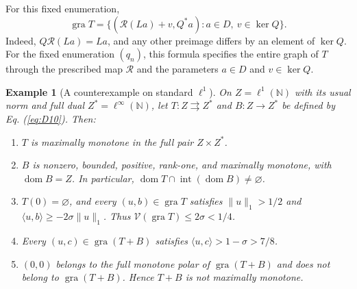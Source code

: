 \documentclass[11pt]{article}
\newcommand{\N}{\mathbb N}
\newcommand{\gra}{\operatorname{gra}}
\newcommand{\dom}{\operatorname{dom}}
\newcommand{\pair}[2]{\langle #1,#2\rangle}
\newtheorem{example}{Example}
\theoremstyle{definition}
\theoremstyle{remark}
\begin{document}
For this fixed enumeration,
\[
\gra T=\{(\mathcal R(La)+v,Q^*a):a\in D,\ v\in\ker Q\}.
\]
Indeed, $Q\mathcal R(La)=La$, and any other preimage differs by an element of $\ker Q$. For the fixed enumeration $(q_n)$, this formula specifies the entire graph of $T$ through the prescribed map $\mathcal R$ and the parameters $a\in D$ and $v\in\ker Q$.

\label{sec:l1}
\begin{example}[A counterexample on standard $\ell^1$]\label{thm:L}
On $Z=\ell^1(\N)$ with its usual norm and full dual $Z^*=\ell^\infty(\N)$, let $T:Z\rightrightarrows Z^*$ and $B:Z\to Z^*$ be defined by Eq. (\ref{eq:D10}). Then:
\begin{enumerate}
\item $T$ is maximally monotone in the full pair $Z\times Z^*$.
\item $B$ is nonzero, bounded, positive, rank-one, and maximally monotone,
with $\dom B=Z$. In particular, $\dom T\cap\operatorname{int}(\dom B)\ne\varnothing$.
\item $T(0)=\varnothing$, and every $(u,b)\in\gra T$ satisfies
$\|u\|_1>1/2$ and $\pair{u}{b}\ge-2\sigma\|u\|_1$. Thus $\mathcal V(\gra T)\le2\sigma<1/4$.
\item Every $(u,c)\in\gra(T+B)$ satisfies
$\pair{u}{c}>1-\sigma>7/8$.
\item $(0,0)$ belongs to the full monotone polar of $\gra(T+B)$ and does
not belong to $\gra(T+B)$. Hence $T+B$ is not maximally monotone.
\end{enumerate}
\end{example}
\end{document}
